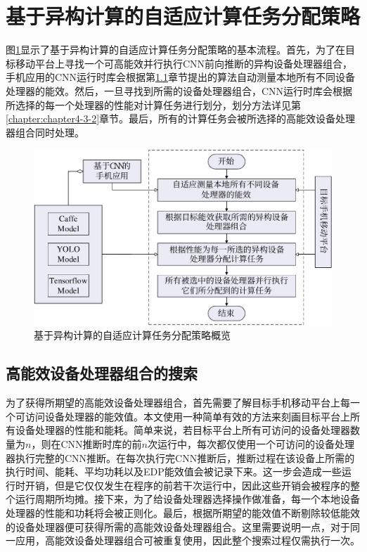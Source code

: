 \section{基于异构计算的自适应计算任务分配策略}

图\ref{figure:figure29}显示了基于异构计算的自适应计算任务分配策略的基本流程。首先，为了在目标移动平台上寻找一个可高能效并行执行CNN前向推断的异构设备处理器组合，手机应用的CNN运行时库会根据第\ref{chapter:chapter4-3-1}章节提出的算法自动测量本地所有不同设备处理器的能效。然后，一旦寻找到所需的设备处理器组合，CNN运行时库会根据所选择的每一个处理器的性能对计算任务进行划分，划分方法详见第\ref{chapter:chapter4-3-2}章节。最后，所有的计算任务会被所选择的高能效设备处理器组合同时处理。

\begin{figure}[htbp]
    \centering
    \includegraphics[height=0.4\textwidth]{figures/strategy_overview.pdf}
    \caption{基于异构计算的自适应计算任务分配策略概览}\label{figure:figure29}
\end{figure}

\subsection{高能效设备处理器组合的搜索}
\label{chapter:chapter4-3-1}

为了获得所期望的高能效设备处理器组合，首先需要了解目标手机移动平台上每一个可访问设备处理器的能效值。本文使用一种简单有效的方法来刻画目标平台上所有设备处理器的性能和能耗。简单来说，若目标平台上所有可访问的设备处理器数量为$n$，则在CNN推断时库的前$n$次运行中，每次都仅使用一个可访问的设备处理器执行完整的CNN推断。在每次执行完CNN推断后，推断过程在该设备上所需的执行时间、能耗、平均功耗以及EDP能效值会被记录下来。这一步会造成一些运行时开销，但是它仅仅发生在程序的前若干次运行中，因此这些开销会被程序的整个运行周期所均摊。接下来，为了给设备处理器选择操作做准备，每一个本地设备处理器的性能和功耗将会被正则化。最后，根据所期望的能效值不断剔除较低能效的设备处理器便可获得所需的高能效设备处理器组合。这里需要说明一点，对于同一应用，高能效设备处理器组合可被重复使用，因此整个搜索过程仅需执行一次。

